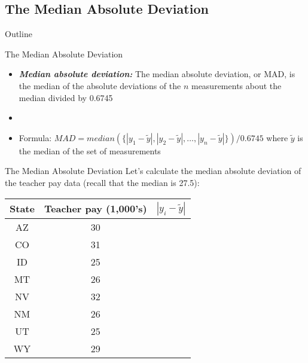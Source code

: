 \documentclass[xcolor=dvipsnames]{beamer}
\begin{document}
\subsection{The Median Absolute Deviation}
\begin{frame}{Outline}
	\tableofcontents[currentsection,subsectionstyle=show/shaded/hide]
\end{frame}

\begin{frame}{The Median Absolute Deviation}
	\begin{itemize}
		\item \textbf{\emph{Median absolute deviation:}} The median absolute deviation, or MAD, is the median of the absolute deviations of the $n$ measurements about the median divided by 0.6745 \pause
		\item[]
		\item Formula: $MAD = median(\{|y_1-\tilde{y}|,|y_2 - \tilde{y}|,\hdots,|y_n - \tilde{y}|\}) / 0.6745$
		where $\tilde{y}$ is the median of the set of measurements
	\end{itemize}
\end{frame}

\begin{frame}{The Median Absolute Deviation}
	Let's calculate the median absolute deviation of the teacher pay data (recall that the median is 27.5):
	\begin{center}
		\begin{tabular}{|c|c|c|}
			\hline 
			\textbf{State} & \textbf{Teacher pay (1,000's)} &  $|y_i-\tilde{y}|$ \\ 
			\hline \hline
			AZ & 30 & \\ \hline 
			CO &  31 & \\ \hline 
			ID & 25  & \\  \hline 
			MT &  26 & \\ \hline 
			NV & 32 & \\ \hline 
			NM &  26 & \\ \hline 
			UT &  25 & \\ \hline 
			WY &  29 & \\ \hline 
		\end{tabular} 
	\end{center}
\end{frame}
\end{document}

